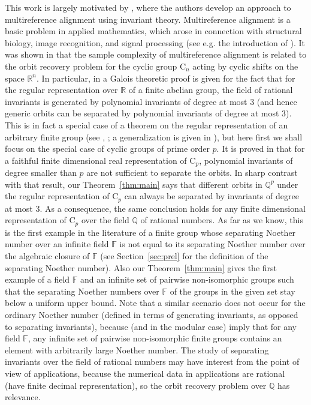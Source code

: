 \documentclass[12pt, oneside]{amsart}
\def\QQ{\mathbb{Q}}
\def\RR{\mathbb{R}}
\def\FF{\mathbb{F}}
\begin{document}
This work is largely motivated by  \cite{bandeire-blumsmith-kileel-niles-weed-perry-wein}, 
where the authors develop an approach to multireference alignment using invariant theory. 
Multireference alignment is a basic problem in applied mathematics, which arose in connection with structural biology, image recognition, and signal processing 
(see e.g. the introduction of \cite{bandeira-rigollet-weed}). 
It was shown in \cite{perry_etal}  that the sample complexity of multireference alignment is related to the orbit recovery problem for the cyclic group $\mathrm{C}_n$ 
acting by cyclic shifts on the space $\RR^n$.  
In particular, in  \cite[Theorem 4.1]{bandeire-blumsmith-kileel-niles-weed-perry-wein} a Galois theoretic proof is given for the fact that for the regular representation  
over $\RR$ of a finite abelian group,  
the field of rational invariants is generated by polynomial invariants of degree at most $3$ 
(and hence generic orbits can be separated by polynomial invariants of degree at most $3$).  This is in fact a special case of a theorem on the regular representation of an arbitrary 
finite group (see \cite[Remark 4.3]{bandeire-blumsmith-kileel-niles-weed-perry-wein},  
\cite{edidin-katz}; a generalization is given in \cite{blumsmith-derksen}),  
but here first we shall focus on the special case of cyclic groups of prime order $p$. 
It is proved in \cite[Proposition 3.13]{blumsmith-garcia-hidalgo-rodriguez} 
that for a faithful finite dimensional real representation of $\mathrm{C}_p$, 
polynomial invariants of degree smaller than $p$ are not sufficient to separate the orbits. 
In sharp contrast with that result,  our Theorem~\ref{thm:main} says that different orbits in $\QQ^p$ under the regular representation of $\mathrm{C}_p$ can always be separated by invariants of degree at most $3$. As a consequence, the same conclusion holds for any finite dimensional representation of $\mathrm{C}_p$ over the field $\QQ$ of rational numbers. As far as we know, this is the first example in the literature of a finite group whose separating Noether number over an infinite field $\FF$ 
is not equal to its separating Noether number over the algebraic closure 
of $\FF$ (see Section~\ref{sec:prel} for the definition of the separating Noether number). 
Also our Theorem~\ref{thm:main} gives the first example of a field $\FF$ and an infinite set of pairwise non-isomorphic groups 
such that the separating Noether numbers 
over $\FF$ of the groups in the given set stay below a uniform upper bound. 
Note that a similar scenario does not occur for the ordinary Noether number (defined in terms of generating invariants, as opposed to separating invariants), 
because \cite[Theorem 2.1]{cziszter-domokos:lower bound} (and \cite{richman} in the modular case) imply that for any field $\FF$, any infinite set of pairwise non-isomorphic finite groups contains an element 
with arbitrarily large Noether number. 
The study of separating invariants over the field of rational numbers may have 
interest from the point of view of applications, because the numerical data in applications are rational (have finite decimal representation), so the orbit recovery problem over $\QQ$ has relevance. 
\end{document}
